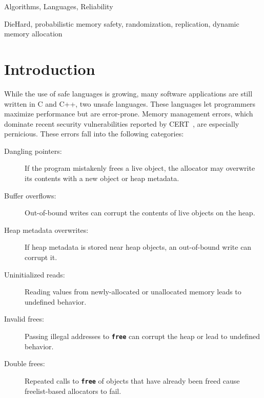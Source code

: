\documentclass{sig-alternate}
\newcommand{\cfunction}[1]{{\bf \tt #1}}
\newcommand{\free}{\cfunction{free}}
\begin{document}

\terms
Algorithms, Languages, Reliability

\keywords
DieHard, probabilistic memory safety, randomization, replication, dynamic memory allocation

\section{Introduction}

\noindent
While the use of safe languages is growing, many software applications
are still written in C and C++, two unsafe languages. These languages let
programmers maximize performance but are error-prone. Memory
management errors, which dominate recent security vulnerabilities
reported by CERT~\cite{uscert}, are especially pernicious. These
errors fall into the following categories:

\begin{description}
\item[Dangling pointers:]
If the program mistakenly frees a live object, the allocator may
overwrite its contents with a new object or heap metadata.

\item[Buffer overflows:]
Out-of-bound writes can corrupt the contents of live objects on the heap.

\item[Heap metadata overwrites:]
If heap metadata is stored near heap objects, an out-of-bound write
can corrupt it.

\item[Uninitialized reads: ]
Reading values from newly-allocated or unallocated memory leads to undefined behavior.

\item[Invalid frees:]
Passing illegal addresses to \free{} can corrupt the heap or lead to
undefined behavior.

\item[Double frees:]
Repeated calls to \free{} of objects that have already been freed 
cause freelist-based allocators to fail.

\end{description}
\end{document}

